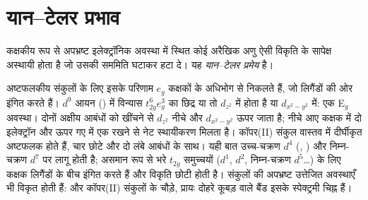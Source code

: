 \section{यान--टेलर प्रभाव}

\begin{theorem}[यान--टेलर प्रमेय]\label{thm:b3:complex-spectra-magnetism:jahn-teller}
कक्षकीय रूप से अपभ्रष्ट इलेक्ट्रॉनिक अवस्था में स्थित कोई अरैखिक अणु ऐसी विकृति के
सापेक्ष अस्थायी होता है जो उसकी सममिति घटाकर
 हटा दे। यह \emph{यान--टेलर प्रमेय} है।
\end{theorem}

\admitted

अष्टफलकीय संकुलों के लिए इसके परिणाम
$e_g$ कक्षकों के अधिभोग से निकलते हैं, जो लिगैंडों की ओर इंगित करते हैं। $d^9$ आयन () में विन्यास
$t_{2g}^6e_g^3$ का छिद्र या तो $d_{z^2}$ में होता है या $d_{x^2-y^2}$ में: एक E$_g$ अवस्था। दोनों अक्षीय
आबंधों को खींचने से $d_{z^2}$ नीचे और $d_{x^2-y^2}$ ऊपर जाता है; नीचे आए कक्षक में दो इलेक्ट्रॉन
और ऊपर गए में एक रखने से नेट स्थायीकरण मिलता है। कॉपर(II) संकुल
वास्तव में दीर्घीकृत अष्टफलक होते हैं, चार छोटे और दो लंबे आबंधों के साथ। यही बात
उच्च-चक्रण $d^4$ (, ) और निम्न-चक्रण $d^7$ पर लागू होती है; असमान रूप से भरे $t_{2g}$ समुच्चयों
($d^1$, $d^2$, निम्न-चक्रण $d^5$\dots) के लिए कक्षक लिगैंडों के बीच इंगित करते हैं और
विकृति छोटी होती है। संकुलों की अपभ्रष्ट उत्तेजित अवस्थाएँ भी विकृत होती हैं:
 और कॉपर(II) संकुलों के चौड़े, प्रायः दोहरे कूबड़ वाले बैंड
इसके स्पेक्ट्रमी चिह्न हैं।

